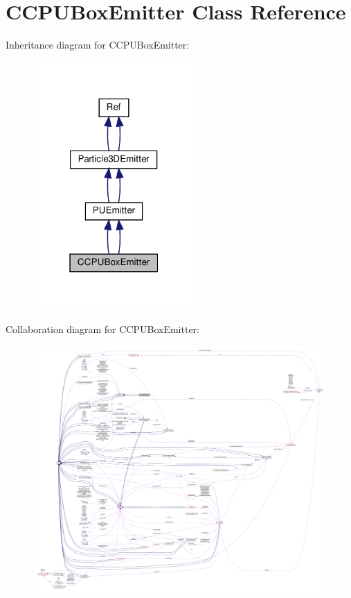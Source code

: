 \hypertarget{classCCPUBoxEmitter}{}\section{C\+C\+P\+U\+Box\+Emitter Class Reference}
\label{classCCPUBoxEmitter}


Inheritance diagram for C\+C\+P\+U\+Box\+Emitter\+:
\nopagebreak
\begin{figure}[H]
\begin{center}
\leavevmode
\includegraphics[width=175pt]{classCCPUBoxEmitter__inherit__graph}
\end{center}
\end{figure}


Collaboration diagram for C\+C\+P\+U\+Box\+Emitter\+:
\nopagebreak
\begin{figure}[H]
\begin{center}
\leavevmode
\includegraphics[width=350pt]{classCCPUBoxEmitter__coll__graph}
\end{center}
\end{figure}
